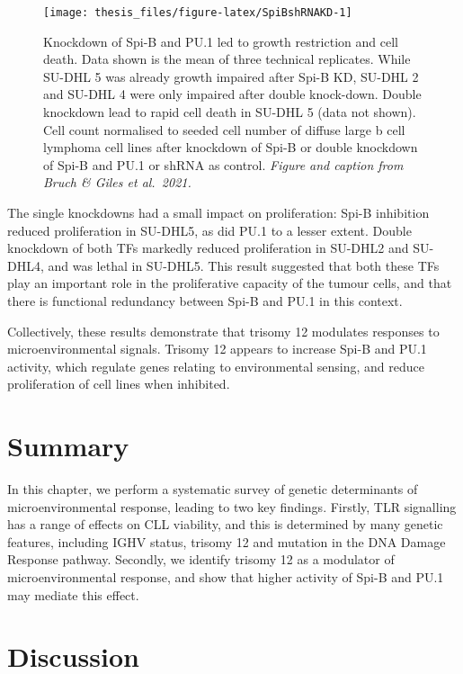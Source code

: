 \documentclass[11pt, a4paper, twosided]{book}
\begin{document}
\begin{figure}

{\centering \texttt{[image: thesis\_files/figure-latex/SpiBshRNAKD-1]} 

}

\caption{Knockdown of Spi-B and PU.1 led to growth restriction and cell death. Data shown is the mean of three technical replicates. While SU-DHL 5 was already growth impaired after Spi-B KD, SU-DHL 2 and SU-DHL 4 were only impaired after double knock-down. Double knockdown lead to rapid cell death in SU-DHL 5 (data not shown). Cell count normalised to seeded cell number of diffuse large b cell lymphoma cell lines after knockdown of Spi-B or double knockdown of Spi-B and PU.1 or shRNA as control. \emph{Figure and caption from Bruch \& Giles et al.~2021.}}\label{fig:SpiBshRNAKD}
\end{figure}
The single knockdowns had a small impact on proliferation: Spi-B inhibition reduced proliferation in SU-DHL5, as did PU.1 to a lesser extent. Double knockdown of both TFs markedly reduced proliferation in SU-DHL2 and SU-DHL4, and was lethal in SU-DHL5. This result suggested that both these TFs play an important role in the proliferative capacity of the tumour cells, and that there is functional redundancy between Spi-B and PU.1 in this context.

Collectively, these results demonstrate that trisomy 12 modulates responses to microenvironmental signals. Trisomy 12 appears to increase Spi-B and PU.1 activity, which regulate genes relating to environmental sensing, and reduce proliferation of cell lines when inhibited.

\hypertarget{summary-1}{%
\section{Summary}\label{summary-1}}

In this chapter, we perform a systematic survey of genetic determinants of microenvironmental response, leading to two key findings. Firstly, TLR signalling has a range of effects on CLL viability, and this is determined by many genetic features, including IGHV status, trisomy 12 and mutation in the DNA Damage Response pathway. Secondly, we identify trisomy 12 as a modulator of microenvironmental response, and show that higher activity of Spi-B and PU.1 may mediate this effect.

\hypertarget{discussion}{%
\section{Discussion}\label{discussion}}
\end{document}
